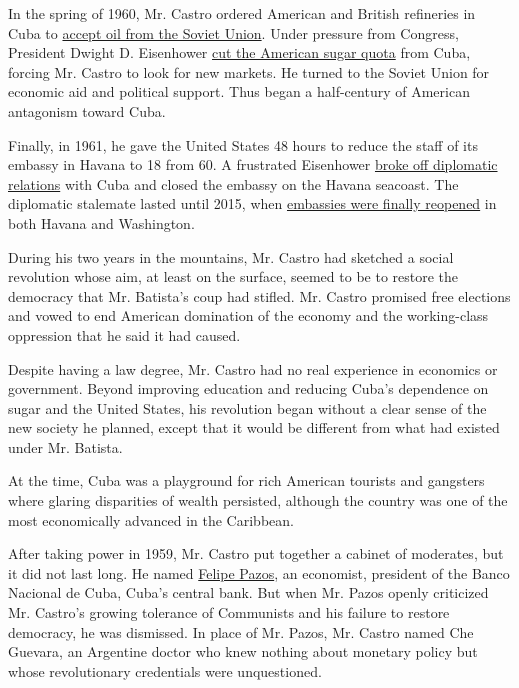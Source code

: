 In the spring of 1960, Mr. Castro ordered American and British
refineries in Cuba to
\href{http://query.nytimes3xbfgragh.onion/mem/archive-free/pdf?res=9402E5D9153DE333A25757C2A9639C946191D6CF}{accept
oil from the Soviet Union}. Under pressure from Congress, President
Dwight D. Eisenhower
\href{http://timesmachine.nytimes3xbfgragh.onion/timesmachine/1960/05/24/105436278.html?pageNumber=5\&rpm=true\&zoom=16}{cut
the American sugar quota} from Cuba, forcing Mr. Castro to look for new
markets. He turned to the Soviet Union for economic aid and political
support. Thus began a half-century of American antagonism toward Cuba.

Finally, in 1961, he gave the United States 48 hours to reduce the staff
of its embassy in Havana to 18 from 60. A frustrated Eisenhower
\href{http://query.nytimes3xbfgragh.onion/gst/abstract.html?res=9F02E2D81E31EE32A25757C0A9679C946091D6CF}{broke
off diplomatic relations} with Cuba and closed the embassy on the Havana
seacoast. The diplomatic stalemate lasted until 2015, when
\href{http://www.nytimes3xbfgragh.onion/2015/07/21/world/americas/cuba-us-embassy-diplomatic-relations.html}{embassies
were finally reopened} in both Havana and Washington.

During his two years in the mountains, Mr. Castro had sketched a social
revolution whose aim, at least on the surface, seemed to be to restore
the democracy that Mr. Batista's coup had stifled. Mr. Castro promised
free elections and vowed to end American domination of the economy and
the working-class oppression that he said it had caused.

Despite having a law degree, Mr. Castro had no real experience in
economics or government. Beyond improving education and reducing Cuba's
dependence on sugar and the United States, his revolution began without
a clear sense of the new society he planned, except that it would be
different from what had existed under Mr. Batista.

At the time, Cuba was a playground for rich American tourists and
gangsters where glaring disparities of wealth persisted, although the
country was one of the most economically advanced in the Caribbean.

After taking power in 1959, Mr. Castro put together a cabinet of
moderates, but it did not last long. He named
\href{http://www.nytimes3xbfgragh.onion/2001/03/09/world/felipe-pazos-88-economist-cuban-split-early-with-castro.html}{Felipe
Pazos}, an economist, president of the Banco Nacional de Cuba, Cuba's
central bank. But when Mr. Pazos openly criticized Mr. Castro's growing
tolerance of Communists and his failure to restore democracy, he was
dismissed. In place of Mr. Pazos, Mr. Castro named Che Guevara, an
Argentine doctor who knew nothing about monetary policy but whose
revolutionary credentials were unquestioned.

